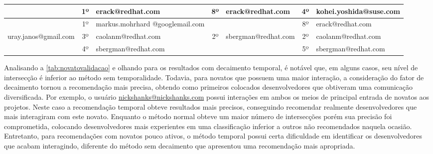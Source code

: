 \documentclass[oneside,brazil,a4paper]{normas-utf-tex}
\begin{document}
\begin{table}[hbt]
\begin{tabularx}{\textwidth}{|X|c|X|c|X|c|X|}
                                           & 1º & erack@redhat.com                  & 8º &  erack@redhat.com     & 4º & kohei.yoshida@suse.com\\\hline
                                           & 1º & markus.mohrhard @googlemail.com    &    &                       & 8º & erack@redhat.com\\\hline
                uray.janos@gmail.com       & 3º & caolanm@redhat.com                & 2º &  sbergman@redhat.com  & 2º & caolanm@redhat.com\\\hline
                                           & 4º & sbergman@redhat.com               &    &                       & 5º & sbergman@redhat.com\\\hline
    \end{tabularx}
\end{table}

Analisando a \cref{tab:novatovalidacao} e olhando para os resultados com decaimento temporal, é notável que, em alguns casos, seu nível de intersecção é inferior ao método sem temporalidade. Todavia, para novatos que possuem uma maior interação, a consideração do fator de decaimento tornou a recomendação mais precisa, obtendo como primeiros colocados desenvolvedores que obtiveram uma comunicação diversificada. Por exemplo, o usuário \url{nickshanks@nickshanks.com} possui interações em ambos os meios de principal entrada de novatos aos projetos. Neste caso a recomendação temporal obteve resultados mais precisos, conseguindo recomendar realmente desenvolvedores que mais interagiram com este novato.  Enquanto o método normal  obteve um maior número de intersecções porém sua precisão foi comprometida, colocando desenvolvedores mais experientes em uma classificação inferior a outros não recomendados naquela ocasião. Entretanto, para recomendações com novatos pouco ativos, o método temporal possui certa dificuldade em identificar os desenvolvedores que acabam interagindo, diferente do método sem decaimento que apresentou uma recomendação mais apropriada.
\end{document}
